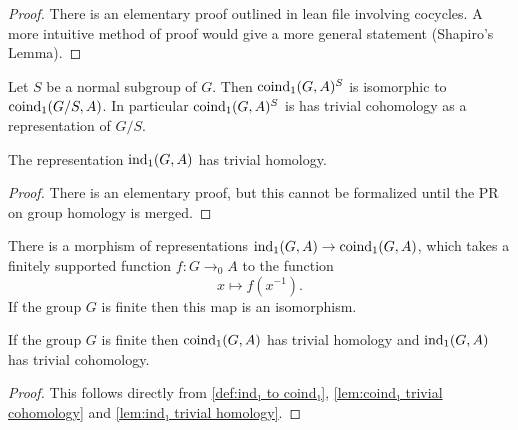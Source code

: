\begin{proof}
	There is an elementary proof outlined in lean file involving cocycles.
	A more intuitive method of proof would give a more general statement (Shapiro's Lemma).
\end{proof}

\begin{lemma}	\label{lem:coind₁ invariants}
	\leanok
	Let $S$ be a normal subgroup of $G$. Then $\mathrm{coind}_1(G,A)^S$ is isomorphic to $\mathrm{coind}_1(G/S,A)$.
	In particular $\mathrm{coind}_1(G,A)^S$ is has trivial cohomology as a representation of $G/S$.
\end{lemma}

\begin{lemma}	\label{lem:ind₁ trivial homology}
	\leanok
	The representation $\mathrm{ind}_1(G,A)$ has trivial homology.
\end{lemma}

\begin{proof}
	There is an elementary proof, but this cannot be formalized until
	the PR on group homology is merged.
\end{proof}

\begin{definition} \label{def:ind₁ to coind₁}
	\leanok
	There is a morphism of representations $\mathrm{ind}_1(G,A) \to \mathrm{coind}_1(G,A)$,
	which takes a finitely supported function $f : G \to_0 A$ to the function
	\[
		x \mapsto f(x^{-1}).
	\]
	If the group $G$ is finite then this map is an isomorphism.
\end{definition}

\begin{corollary}	\label{cor:coind₁ trivial homology}
	If the group $G$ is finite then $\mathrm{coind}_1(G,A)$ has trivial homology
	and $\mathrm{ind}_1(G,A)$ has trivial cohomology.
\end{corollary}

\begin{proof}
	This follows directly from \ref{def:ind₁ to coind₁},	\ref{lem:coind₁ trivial cohomology}
		and \ref{lem:ind₁ trivial homology}.
	\leanok
\end{proof}


